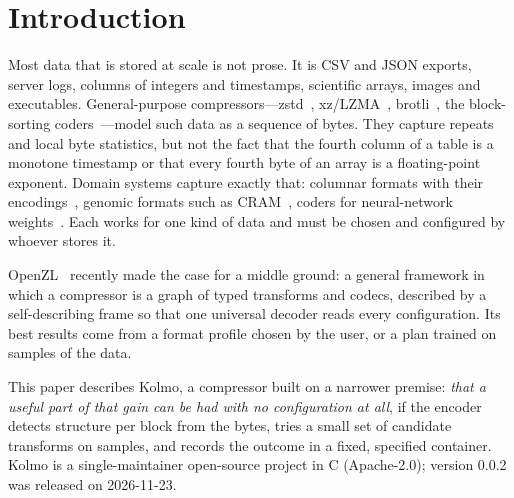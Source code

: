 \documentclass[conference]{IEEEtran}
\begin{document}
\section{Introduction}

Most data that is stored at scale is not prose. It is CSV and JSON exports, server logs, columns of integers and
timestamps, scientific arrays, images and executables. General-purpose compressors---zstd~\cite{zstd_rfc8878},
xz/LZMA~\cite{lzma_xz,lzma_sdk}, brotli~\cite{brotli_rfc7932}, the block-sorting coders~\cite{bwt,bsc,bzip3}---model such
data as a sequence of bytes. They capture repeats and local byte statistics, but not the fact that the fourth column
of a table is a monotone timestamp or that every fourth byte of an array is a floating-point exponent. Domain systems
capture exactly that: columnar formats with their encodings~\cite{parquet,alp,btrblocks,gorilla}, genomic formats
such as CRAM~\cite{cram,cram31}, coders for neural-network weights~\cite{zipnn,dfloat11}. Each works for one kind of
data and must be chosen and configured by whoever stores it.

OpenZL~\cite{openzl,openzl2026,openzl_web} recently made the case for a middle ground: a general framework in which a compressor
is a graph of typed transforms and codecs, described by a self-describing frame so that one universal decoder reads
every configuration. Its best results come from a format profile chosen by the user, or a plan trained on samples of
the data.

This paper describes Kolmo, a compressor built on a narrower premise: \emph{that a useful part of that gain can be had
with no configuration at all}, if the encoder detects structure per block from the bytes, tries a small set of
candidate transforms on samples, and records the outcome in a fixed, specified container. Kolmo is a single-maintainer
open-source project in C (Apache-2.0); version 0.0.2 was released on 2026-11-23.
\end{document}

